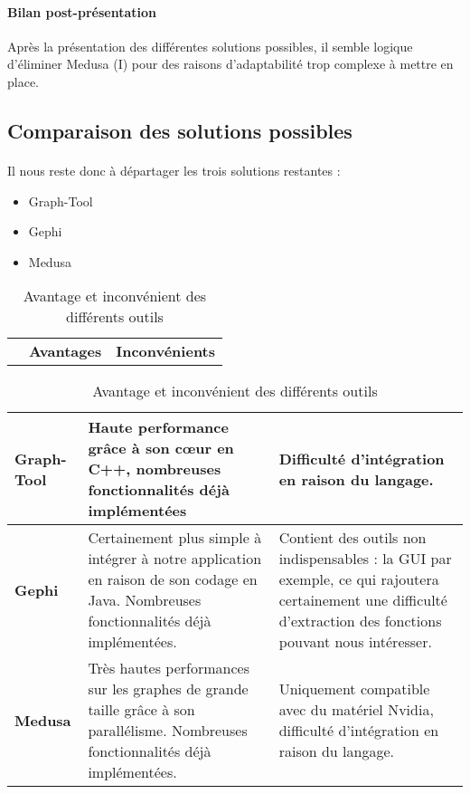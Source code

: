   \paragraph{Bilan post-présentation}
  Après la présentation des différentes solutions possibles, il semble logique d'éliminer  Medusa (I) pour des raisons d'adaptabilité trop complexe à mettre en place.
  
  \subsection{Comparaison des solutions possibles}
  
  \paragraph{}
  Il nous reste donc à départager les trois solutions restantes : 
  \begin{itemize}
  	\item Graph-Tool
  	\item Gephi
  	\item Medusa
  \end{itemize}

    
    \begin{table}[H]
      
      \centering
    
    \begin{tabular}{p{3.5cm}  p{6cm}  p{6cm} }

	& \textbf{Avantages} 		& \textbf{Inconvénients}\\ 
    	
    \end{tabular}

    
    \begin{tabular}{|p{3.5cm} | p{6cm} | p{6cm} |}
      
      \hline
      \textbf{Graph-Tool} 	& Haute performance grâce à son c\oe{}ur en C++, nombreuses fonctionnalités déjà implémentées	
				& Difficulté d'intégration en raison du langage. \\ \hline
      \textbf{Gephi} 		& Certainement plus simple à intégrer à notre application en raison de son codage en Java. Nombreuses fonctionnalités déjà implémentées.
				& Contient des outils non indispensables : la GUI par exemple, ce qui rajoutera certainement une difficulté d'extraction des fonctions pouvant nous intéresser. 	\\ \hline
      \textbf{Medusa} 		& Très hautes performances sur les graphes de grande taille grâce à son parallélisme. Nombreuses fonctionnalités déjà implémentées.
				& Uniquement compatible avec du matériel Nvidia, difficulté d'intégration en raison du langage.	\\ \hline
    \end{tabular}

    \caption{Avantage et inconvénient des différents outils }
  \end{table}
  

